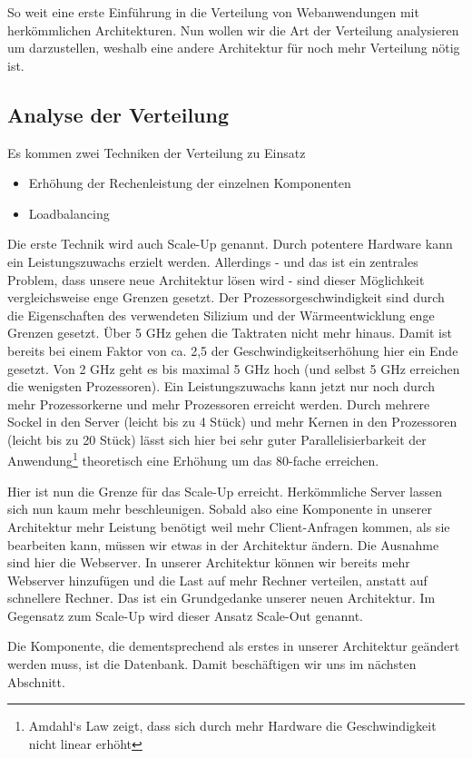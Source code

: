 So weit eine erste Einführung in die Verteilung von Webanwendungen mit herkömmlichen Architekturen.
Nun wollen wir die Art der Verteilung analysieren um darzustellen, weshalb eine andere Architektur für noch
mehr Verteilung nötig ist.

\subsection{Analyse der Verteilung}
Es kommen zwei Techniken der Verteilung zu Einsatz
\begin{itemize}
  \item Erhöhung der Rechenleistung der einzelnen Komponenten
  \item Loadbalancing
\end{itemize}

Die erste Technik wird auch Scale-Up genannt. Durch potentere Hardware kann ein Leistungszuwachs erzielt werden.
Allerdings - und das ist ein zentrales Problem, dass unsere neue Architektur lösen wird - sind dieser Möglichkeit
vergleichsweise enge Grenzen gesetzt. Der Prozessorgeschwindigkeit sind durch die Eigenschaften des verwendeten
Silizium und der Wärmeentwicklung enge Grenzen gesetzt. Über 5 GHz gehen die Taktraten nicht mehr hinaus.
Damit ist bereits bei einem Faktor von ca. 2,5 der Geschwindigkeitserhöhung hier ein Ende gesetzt. Von 2 GHz
geht es bis maximal 5 GHz hoch (und selbst 5 GHz erreichen die wenigsten Prozessoren). Ein Leistungszuwachs
kann jetzt nur noch durch mehr Prozessorkerne und mehr Prozessoren erreicht werden. Durch mehrere Sockel
in den Server (leicht bis zu 4 Stück) und mehr Kernen in den Prozessoren (leicht bis zu 20 Stück) lässt sich hier
bei sehr guter Parallelisierbarkeit der Anwendung\footnote{Amdahl‘s Law zeigt, dass sich durch mehr
Hardware die Geschwindigkeit nicht linear erhöht} theoretisch eine Erhöhung um das 80-fache erreichen.

Hier ist nun die Grenze für das Scale-Up erreicht. Herkömmliche Server lassen sich nun kaum mehr beschleunigen.
Sobald also eine Komponente in unserer Architektur mehr Leistung benötigt weil mehr Client-Anfragen kommen,
als sie bearbeiten kann, müssen wir etwas in der Architektur ändern. Die Ausnahme sind hier die Webserver.
In unserer Architektur können wir bereits mehr Webserver hinzufügen und die Last auf mehr Rechner verteilen,
anstatt auf schnellere Rechner. Das ist ein Grundgedanke unserer neuen Architektur. Im Gegensatz zum Scale-Up
wird dieser Ansatz Scale-Out genannt.

Die Komponente, die dementsprechend als erstes in unserer Architektur geändert werden muss, ist die Datenbank.
Damit beschäftigen wir uns im nächsten Abschnitt.

